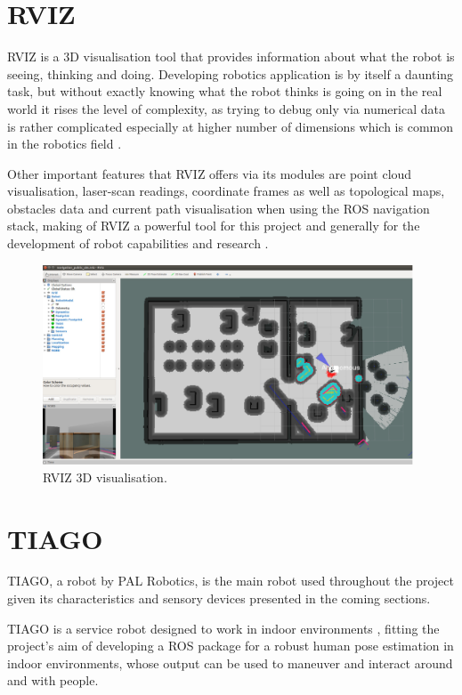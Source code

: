 \section{RVIZ}

RVIZ is a 3D visualisation tool that provides information about what the robot is seeing, thinking and doing. Developing robotics application is by itself a daunting task, but without exactly knowing what the robot thinks is going on in the real world it rises the level of complexity, as trying to debug only via numerical data is rather complicated especially at higher number of dimensions which is common in the robotics field \cite{website:RVIZ}. 

Other important features that RVIZ offers via its modules are point cloud visualisation, laser-scan readings, coordinate frames as well as topological maps, obstacles data and current path visualisation when using the ROS navigation stack, making of RVIZ a powerful tool for this project and generally for the development of robot capabilities and research \cite{website:RVIZ}.

\begin{figure}[H]
\begin{center}
\includegraphics[width=11cm]{images/chapter2_rviz_screenshot.png}
\end{center}
\caption{RVIZ 3D visualisation.}
\label{fig:rviz_screenshot}
\end{figure}

\section{TIAGO}

TIAGO, a robot by PAL Robotics, is the main robot used throughout the project given its characteristics and sensory devices presented in the coming sections. 

TIAGO is a service robot designed to work in indoor environments \cite{website:TIAGo}, fitting the project's aim of developing a ROS package for a robust human pose estimation in indoor environments, whose output can be used to maneuver and interact around and with people.

